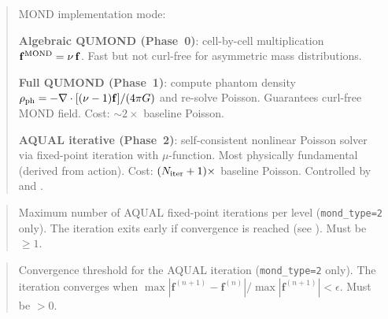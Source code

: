 \begin{quote}
MOND implementation mode:
\begin{description}[style=nextline,leftmargin=2cm,font=\ttfamily]
  \item[0] \textbf{Algebraic QUMOND (Phase~0)}: cell-by-cell
    multiplication $\mathbf{f}^{\rm MOND} = \nu\,\mathbf{f}$.
    Fast but not curl-free for asymmetric mass distributions.
  \item[1] \textbf{Full QUMOND (Phase~1)}: compute phantom density
    $\rho_{\rm ph} = -\nabla\cdot[(\nu-1)\mathbf{f}]/(4\pi G)$
    and re-solve Poisson.  Guarantees curl-free MOND field.
    Cost: $\sim 2\times$ baseline Poisson.
  \item[2] \textbf{AQUAL iterative (Phase~2)}: self-consistent
    nonlinear Poisson solver via fixed-point iteration with
    $\mu$-function.  Most physically fundamental (derived from action).
    Cost: $(N_{\rm iter}+1)\times$ baseline Poisson.
    Controlled by  and .
\end{description}
\end{quote}

\label{param:n_iter_mond}

\begin{quote}
Maximum number of AQUAL fixed-point iterations per level
(\texttt{mond\_type=2} only).  The iteration exits early if convergence
is reached (see ).  Must be $\geq 1$.

\end{quote}

\label{param:mond_eps}

\begin{quote}
Convergence threshold for the AQUAL iteration
(\texttt{mond\_type=2} only).  The iteration converges when
$\max|\mathbf{f}^{(n+1)} - \mathbf{f}^{(n)}| /
\max|\mathbf{f}^{(n+1)}| < \epsilon$.
Must be $> 0$.

\end{quote}

\label{param:g_ext_mond}

